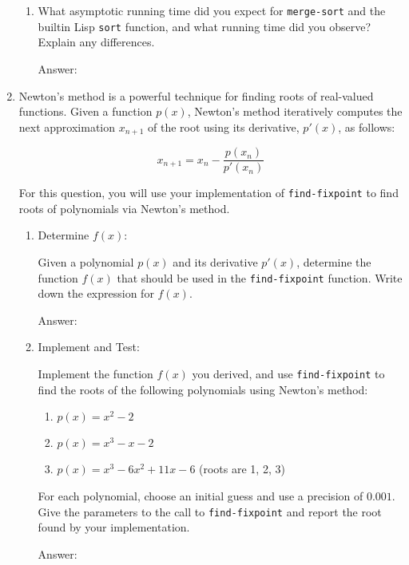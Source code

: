 \documentclass[12pt,letterpaper]{ntdhw}
\begin{document}
\begin{enumerate}
\begin{enumerate}
  \item What asymptotic running time did you expect for
    \texttt{merge-sort} and the builtin Lisp \texttt{sort} function, and
    what running time did you observe?  Explain any differences.

    \begin{emph}
      Answer: %
    \end{emph}

    \end{enumerate}

  \item Newton's method is a powerful technique for finding roots of real-valued functions. Given a function \( p(x) \), Newton's method iteratively computes the next approximation \( x_{n+1} \) of the root using its derivative, \( p'(x) \), as follows:

    \[
    x_{n+1} = x_n - \frac{p(x_n)}{p'(x_n)}
    \]

    For this question, you will use your implementation of {\tt find-fixpoint} to find roots of polynomials via Newton's method.
  \begin{enumerate}
    \item Determine \( f(x) \):

    Given a polynomial \( p(x) \) and its derivative \( p'(x) \), determine the function \( f(x) \) that should be used in the {\tt find-fixpoint} function. Write down the expression for \( f(x) \).

    \begin{emph}
      Answer: %
    \end{emph}

    \item Implement and Test:

    Implement the function \( f(x) \) you derived, and use {\tt find-fixpoint} to find the roots of the following polynomials using Newton's method:
    \begin{enumerate}
      \item \( p(x) = x^2 - 2 \)
      \item \( p(x) = x^3 - x - 2 \)
      \item \( p(x) = x^3 - 6x^2 + 11x - 6 \) (roots are 1, 2, 3)
    \end{enumerate}

    For each polynomial, choose an initial guess and use a precision of \( 0.001 \). Give the parameters to the call to {\tt find-fixpoint} and report the root found by your implementation.

    \begin{emph}
      Answer: %
    \end{emph}

  \end{enumerate}

\end{enumerate}
\end{document}
